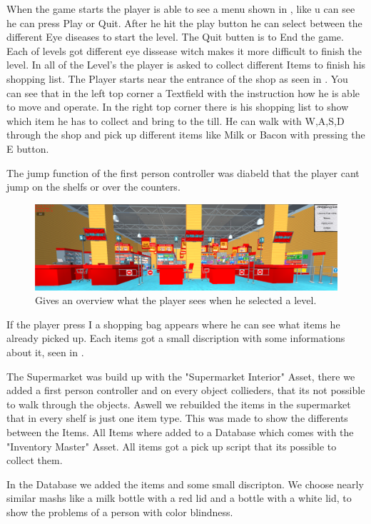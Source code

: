 \documentclass{acm_proc_article-sp}
\begin{document}
When the game starts the player is able to see a menu shown in , like u can see he can press Play or Quit. After he hit the play button he can select between the different Eye diseases to start the level. The Quit butten is to End the game. Each of levels got different eye dissease witch makes it more difficult to finish the level. In all of the Level's the player is asked to collect different Items to finish his shopping list. The Player starts near the entrance of the shop as seen in . You can see that in the left top corner a Textfield with the instruction how he is able to move and operate. In the right top corner there is his shopping list to show which item he has to collect and bring to the till. He can walk with W,A,S,D through the shop and pick up different items like Milk or Bacon with pressing the E button. 

The jump function of the first person controller was diabeld that the player cant jump on the shelfs or over the counters.

\begin{figure}
    \centering
    \includegraphics[width=\columnwidth]{Game.png}
    \caption{Gives an overview what the player sees when he selected a level.}
    \label{fig:gamestart}
\end{figure}

If the player press I a shopping bag appears where he can see what items he already picked up. Each items got a small discription with some informations about it, seen in . 

The Supermarket was build up with the "Supermarket Interior" Asset, there we added a first person controller and on every object collieders, that its not possible to walk through the objects. Aswell we rebuilded the items in the supermarket that in every shelf is just one item type. This was made to show the differents between the Items. All Items where added to a Database which comes with the "Inventory Master" Asset. All items got a pick up script that its possible to collect them. 

In the Database we added the items and some small discripton. We choose nearly similar mashs like a milk bottle with a red lid and a bottle with a white lid, to show the problems of a person with color blindness.
\end{document}
